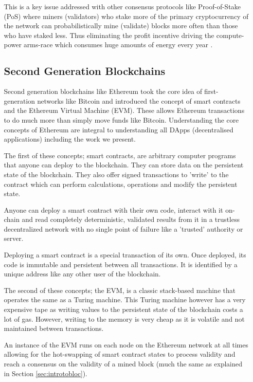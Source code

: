\documentclass[10pt,journal,compsoc]{IEEEtran}
\begin{document}
This is a key issue addressed with other consensus protocols like Proof-of-Stake (PoS) where miners (validators) who stake more of the primary cryptocurrency of the network can probabilistically mine (validate) blocks more often than those who have staked less. Thus eliminating the profit incentive driving the compute-power arms-race which consumes huge amounts of energy every year \cite{Li2019}.

\subsection{Second Generation Blockchains}
Second generation blockchains like Ethereum took the core idea of first-generation networks like Bitcoin and introduced the concept of smart contracts\cite{Buterin2014} and the Ethereum Virtual Machine (EVM). These allows Ethereum transactions to do much more than simply move funds like Bitcoin. Understanding the core concepts of Ethereum are integral to understanding all DApps (decentralised applications) \cite{Cai2018} including the work we present.

The first of these concepts; smart contracts, are arbitrary computer programs that anyone can deploy to the blockchain. They can store data on the persistent state of the blockchain. They also offer signed transactions to 'write' to the contract which can perform calculations, operations and modify the persistent state.

Anyone can deploy a smart contract with their own code, interact with it on-chain and read completely deterministic, validated results from it in a trustless decentralized network with no single point of failure \cite{antonopoulos2018mastering} like a 'trusted' authority or server. 

Deploying a smart contract is a special transaction of its own. Once deployed, its code is immutable and persistent between all transactions. It is identified by a unique address like any other user of the blockchain.

The second of these concepts; the EVM, is a classic stack-based machine that operates the same as a Turing machine. This Turing machine however has a very expensive tape as writing values to the persistent state of the blockchain costs a lot of gas. However, writing to the memory is very cheap as it is volatile and not maintained between transactions. 

An instance of the EVM runs on each node on the Ethereum network at all times allowing for the hot-swapping of smart contract states to process validity and reach a consensus on the validity of a mined block (much the same as explained in Section \ref{sec:introtobloc}).
\end{document}
